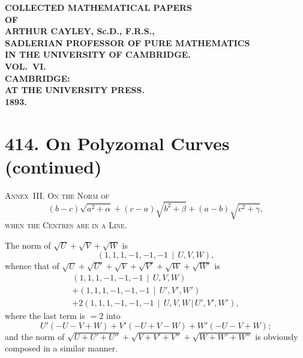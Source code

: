 \documentclass[11pt,a4paper]{article}
\theoremstyle{plain}
\theoremstyle{definition}
\theoremstyle{remark}
\begin{document}
\begin{center}
\LARGE\bfseries COLLECTED MATHEMATICAL PAPERS\\[6pt]
\large OF\\[6pt]
\LARGE ARTHUR CAYLEY, Sc.D., F.R.S.,\\[6pt]
\large SADLERIAN PROFESSOR OF PURE MATHEMATICS\\
IN THE UNIVERSITY OF CAMBRIDGE.\\[12pt]
\Large VOL.~VI.\\[24pt]
\normalsize
CAMBRIDGE:\\
AT THE UNIVERSITY PRESS.\\[6pt]
1893.
\end{center}

\newpage
\setcounter{page}{601}


\section*{414. On Polyzomal Curves (continued)}

\setcounter{section}{414}
\setcounter{equation}{0}

\noindent\textsc{Annex~III. On the Norm of}
\[
(b-c)\sqrt{a^2+\alpha}+(c-a)\sqrt{b^2+\beta}+(a-b)\sqrt{c^2+\gamma},
\]
\textsc{when the Centres are in a Line.}

\smallskip

The norm of $\sqrt{U}+\sqrt{V}+\sqrt{W}$ is
\[
(1,1,1,-1,-1,-1\,\mid\,U,V,W),
\]
whence that of $\sqrt{U}+\sqrt{U'}+\sqrt{V}+\sqrt{V'}+\sqrt{W}+\sqrt{W'}$ is
\begin{multline*}
(1,1,1,-1,-1,-1\,\mid\,U,V,W)\\
+(1,1,1,-1,-1,-1\,\mid\,U',V',W')\\
+2(1,1,1,-1,-1,-1\,\mid\,U,V,W\,|\,U',V',W'),
\end{multline*}
where the last term is $=2$ into
\[
U'(-U-V+W)+V'(-U+V-W)+W'(-U-V+W);
\]
and the norm of $\sqrt{U+U'+U''}+\sqrt{V+V'+V''}+\sqrt{W+W'+W''}$ is obviously composed in a similar manner.
\end{document}
